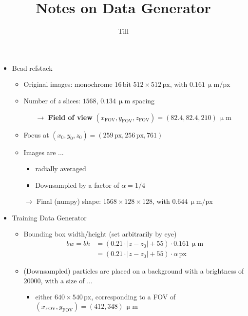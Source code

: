 \documentclass[
  headings=standardclasses,
  a4paper,
  parskip=half,  %
  cleardoublepage=plain,  %
  DIV=11,
  fontsize=10.5pt
  ]{scrartcl}
\title{Notes on Data Generator}
\author{Till}
\begin{document}
    \maketitle
    \begin{itemize}
        \item Bead refstack
        \begin{itemize}
            \item Original images: monochrome $16 \,\text{bit}$ $512\times512 \,\text{px}$, with $0.161\,\upmu\mathrm{m}/\mathrm{px}$
            \item Number of $z$ slices: $1568$, $0.134 \,\upmu\mathrm{m}$ spacing
            \begin{itemize}
                \item[$\rightarrow$] \textbf{Field of view} $(x_{\text{FOV}},y_{\text{FOV}},z_{\text{FOV}})=(82.4,82.4,210)\,\upmu\mathrm{m}$
            \end{itemize}
            \item Focus at $(x_0,y_0,z_0)=(259\,\text{px},256\,\text{px},761)$
            \item Images are ...
            \begin{itemize}
                \item radially averaged
                \item Downsampled by a factor of $\alpha=1/4$
            \end{itemize} 
            \item[$\rightarrow$]  Final (numpy) shape: $1568\times128\times128$, with $0.644\,\upmu\mathrm{m}/\mathrm{px}$
        \end{itemize}
        \item[]
        \item Training Data Generator
        \begin{itemize}
            \item Bounding box width/height (set arbitrarily by eye)
            \begin{align*}
                bw = bh &= (0.21\cdot|z-z_0|+55) \cdot 0.161\,\upmu\mathrm{m} \\ &= (0.21\cdot|z-z_0|+55) \cdot \alpha \,\mathrm{px}
            \end{align*}
            \item (Downsampled) particles are placed on a background with a brightness of $\num{20000}$, with a size of ...\begin{itemize}
                \item either $640\times540 \,\text{px}$, corresponding to a FOV of $(x_{\text{FOV}},y_{\text{FOV}})=(412, 348) \, \upmu\text{m}$

\end{itemize}
\end{itemize}
\end{itemize}
\end{document}
